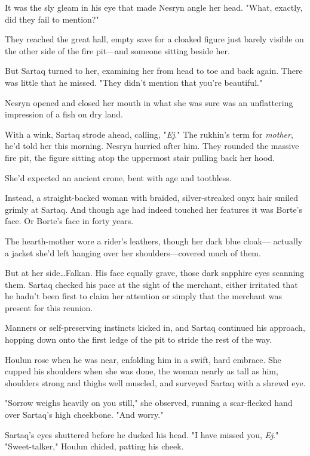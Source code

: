It was the sly gleam in his eye that made Nesryn angle her head.
"What, exactly, did they fail to mention?"

They reached the great hall, empty save for a cloaked figure just barely visible on the other side of the fire pit---and someone sitting beside her.

But Sartaq turned to her, examining her from head to toe and back again.
There was little that he missed.
"They didn't mention that you're beautiful."

Nesryn opened and closed her mouth in what she was sure was an unflattering impression of a fish on dry land.

With a wink, Sartaq strode ahead, calling, "\emph{Ej}."
The rukhin's term for \emph{mother}, he'd told her this morning.
Nesryn hurried after him.
They rounded the massive fire pit, the figure sitting atop the uppermost stair pulling back her hood.

She'd expected an ancient crone, bent with age and toothless.

Instead, a straight-backed woman with braided, silver-streaked onyx hair smiled grimly at Sartaq.
And though age had indeed touched her features  it was Borte's face.
Or Borte's face in forty years.

The hearth-mother wore a rider's leathers, though her dark blue cloak--- actually a jacket she'd left hanging over her shoulders---covered much of them.

But at her side\ldots Falkan.
His face equally grave, those dark sapphire eyes scanning them.
Sartaq checked his pace at the sight of the merchant, either irritated that he hadn't been first to claim her attention or simply that the merchant was present for this reunion.

Manners or self-preserving instincts kicked in, and Sartaq continued his approach, hopping down onto the first ledge of the pit to stride the rest of the way.

Houlun rose when he was near, enfolding him in a swift, hard embrace.
She cupped his shoulders when she was done, the woman nearly as tall as him, shoulders strong and thighs well muscled, and surveyed Sartaq with a shrewd eye.

"Sorrow weighs heavily on you still," she observed, running a scar-flecked hand over Sartaq's high cheekbone.
"And worry."

Sartaq's eyes shuttered before he ducked his head.
"I have missed you,
\emph{Ej}."
"Sweet-talker," Houlun chided, patting his cheek.

